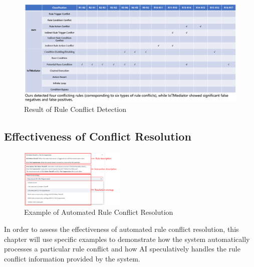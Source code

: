 \begin{figure}[htbp]
	\centering
	\includegraphics[width=\textwidth]{figure/conflict_detection_result.png}
	\caption{Result of Rule Conflict Detection}
	\label{conflict_detection_result}
\end{figure}

\subsection{Effectiveness of Conflict Resolution}

\begin{figure}[htbp]
	\centering
	\includegraphics[width=0.45\textwidth]{figure/resolution_example.png}
	\caption{Example of Automated Rule Conflict Resolution}
	\label{example_resolution}
\end{figure}

In order to assess the effectiveness of automated rule conflict resolution, this chapter will use specific examples to demonstrate how the system automatically processes a particular rule conflict and how AI speculatively handles the rule conflict information provided by the system.

